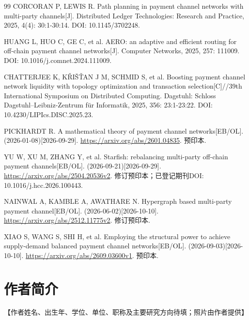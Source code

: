 \documentclass[UTF8,a4paper,twocolumn,fontset=none,zihao=5]{ctexart}
\begin{document}
\begin{thebibliography}{99}
 CORCORAN P, LEWIS R. Path planning in payment channel networks with multi-party channels[J]. Distributed Ledger Technologies: Research and Practice, 2025, 4(4): 30:1-30:14. DOI: 10.1145/3702248.

 HUANG L, HUO C, GE C, et al. AERO: an adaptive and efficient routing for off-chain payment channel networks[J]. Computer Networks, 2025, 257: 111009. DOI: 10.1016/j.comnet.2024.111009.

 CHATTERJEE K, KŘIŠŤAN J M, SCHMID S, et al. Boosting payment channel network liquidity with topology optimization and transaction selection[C]//39th International Symposium on Distributed Computing. Dagstuhl: Schloss Dagstuhl–Leibniz-Zentrum für Informatik, 2025, 356: 23:1-23:22. DOI: 10.4230/LIPIcs.DISC.2025.23.

 PICKHARDT R. A mathematical theory of payment channel networks[EB/OL]. (2026-01-08)[2026-09-29]. \url{https://arxiv.org/abs/2601.04835}. 预印本.

 YU W, XU M, ZHANG Y, et al. Starfish: rebalancing multi-party off-chain payment channels[EB/OL]. (2026-09-21)[2026-09-29]. \url{https://arxiv.org/abs/2504.20536v2}. 修订预印本；已登记期刊DOI: 10.1016/j.hcc.2026.100443.

 NAINWAL A, KAMBLE A, AWATHARE N. Hypergraph based multi-party payment channel[EB/OL]. (2026-06-02)[2026-10-10]. \url{https://arxiv.org/abs/2512.11775v2}. 修订预印本.

 XIAO S, WANG S, SHI H, et al. Employing the structural power to achieve supply-demand balanced payment channel networks[EB/OL]. (2026-09-03)[2026-10-10]. \url{https://arxiv.org/abs/2609.03600v1}. 预印本.

\end{thebibliography}\section*{作者简介}

【作者姓名、出生年、学位、单位、职称及主要研究方向待填；照片由作者提供】
\end{document}
